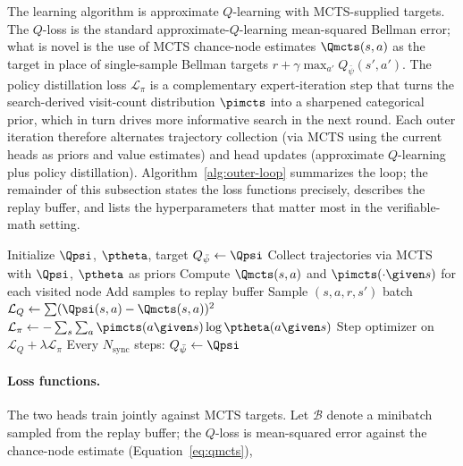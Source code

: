 The learning algorithm is approximate $Q$-learning
\citep{mnih2015human, sutton2018reinforcement} with MCTS-supplied
targets. The $Q$-loss is the standard approximate-$Q$-learning
mean-squared Bellman error; what is novel is the use of MCTS chance-node
estimates $\Qmcts(s, a)$ as the target in place of single-sample
Bellman targets $r + \gamma \max_{a'} Q_{\bar\psi}(s', a')$. The
policy distillation loss $\mathcal{L}_\pi$ is a complementary
expert-iteration step \citep{anthony2017thinking, silver2017alphagozero}
that turns the search-derived visit-count distribution $\pimcts$ into a
sharpened categorical prior, which in turn drives more informative
search in the next round. Each outer iteration therefore alternates
trajectory collection (via MCTS using the current heads as priors and
value estimates) and head updates (approximate $Q$-learning plus policy
distillation). Algorithm~\ref{alg:outer-loop} summarizes the loop; the
remainder of this subsection states the loss functions precisely,
describes the replay buffer, and lists the hyperparameters that matter
most in the verifiable-math setting.

\begin{algorithm}[t]
\caption{Outer training loop}
\label{alg:outer-loop}
\begin{algorithmic}[1]
\State Initialize $\Qpsi$, $\ptheta$, target $Q_{\bar\psi} \gets \Qpsi$
  \State Collect trajectories via MCTS with $\Qpsi$, $\ptheta$ as priors
  \State Compute $\Qmcts(s, a)$ and $\pimcts(\cdot \given s)$ for each
         visited node
  \State Add samples to replay buffer
    \State Sample $(s, a, r, s')$ batch
    \State $\mathcal{L}_Q \gets \sum (\Qpsi(s, a) - \Qmcts(s, a))^2$
    \State $\mathcal{L}_\pi \gets - \sum_s \sum_a \pimcts(a \given s)
           \log \ptheta(a \given s)$
    \State Step optimizer on $\mathcal{L}_Q + \lambda \mathcal{L}_\pi$
  \EndFor
  \State Every $N_{\mathrm{sync}}$ steps: $Q_{\bar\psi} \gets \Qpsi$
\EndFor
\end{algorithmic}
\end{algorithm}

\paragraph{Loss functions.}
The two heads train jointly against MCTS targets. Let $\mathcal{B}$
denote a minibatch sampled from the replay buffer; the $Q$-loss is
mean-squared error against the chance-node estimate
(Equation~\ref{eq:qmcts}),

